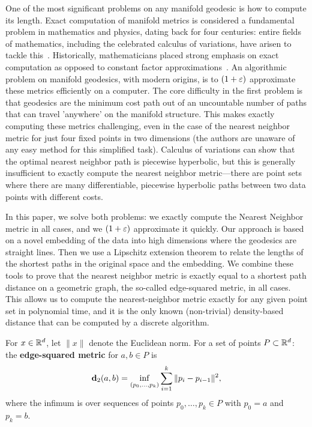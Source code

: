 One of the most significant problems on any manifold geodesic is how to
compute its length.  Exact computation of manifold metrics is considered a
fundamental problem in mathematics and physics, dating back for four
centuries: entire fields of mathematics, including the celebrated calculus
of variations, have arisen to tackle this~\cite{Courant53}. Historically,
mathematicians placed strong emphasis on exact computation as opposed to
constant factor approximations~\cite{Courant53}. An algorithmic problem on manifold
geodesics, with modern origins, is to $(1+\varepsilon)$ approximate these metrics
efficiently on a computer.  The core difficulty in the first problem is
that geodesics are the minimum cost path out of an uncountable number of
paths that can travel 'anywhere' on the manifold structure.  This makes
exactly computing these metrics challenging, even in the case of the
nearest neighbor metric for just four fixed points in two dimensions (the
authors are unaware of any easy method for this simplified task).
Calculus of variations can show that the optimal nearest neighbor path is
piecewise hyperbolic, but this is generally insufficient to exactly compute
the nearest neighbor metric---there are point sets where there are
many differentiable, piecewise hyperbolic paths between two data points with
different costs.


In this paper, we solve both problems: we exactly compute the Nearest
Neighbor metric in all cases, and we $(1+\varepsilon)$ approximate it quickly.
Our approach is based on a novel embedding of the data into high dimensions where the geodesics are straight lines.
Then we use a Lipschitz extension theorem to relate the lengths of the shortest paths in the original space and the embedding.
We combine these tools to prove that the nearest neighbor metric is exactly equal to a shortest path distance on a geometric graph, the so-called edge-squared metric, in all cases.
This allows us to compute the nearest-neighbor metric exactly for any given point set in polynomial time, and it is the only known (non-trivial) density-based distance that can be computed by a discrete algorithm.

  \begin{definition}
For $x\in \mathbb{R}^d$, let $\|x\|$ denote the Euclidean norm.
  For a set of points $P\subset \mathbb{R}^d$:
  the \textbf{edge-squared metric} for $a,b\in P$ is
  \[
    \mathbf{d}_2(a,b) = \inf_{(p_0,\ldots, p_k)}\sum_{i=1}^k \|p_i - p_{i-1}\|^2,
  \]
  where the infimum is over sequences of points $p_0,\ldots, p_k\in P$ with $p_0 = a$ and $p_k = b$.
  \end{definition}

